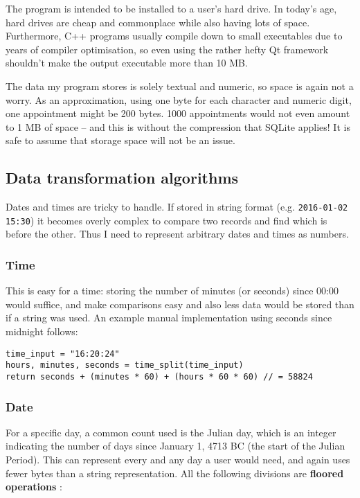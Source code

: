 The program is intended to be installed to a user's hard drive. In today's age,
hard drives are cheap and commonplace while also having lots of space.
Furthermore, C++ programs usually compile down to small executables due to years
of compiler optimisation, so even using the rather hefty Qt framework shouldn't
make the output executable more than 10 MB.

The data my program stores is solely textual and numeric, so space is again not
a worry. As an approximation, using one byte for each character and numeric
digit, one appointment might be 200 bytes. 1000 appointments would not even
amount to 1 MB of space -- and this is without the compression that SQLite
applies! It is safe to assume that storage space will not be an issue.


\subsection{Data transformation algorithms}

Dates and times are tricky to handle. If stored in string format (e.g.
\texttt{2016-01-02 15:30}) it becomes overly complex to compare two records and
find which is before the other. Thus I need to represent arbitrary dates and
times as numbers.


\subsubsection{Time}

This is easy for a time: storing the number of minutes (or seconds) since 00:00
would suffice, and make comparisons easy and also less data would be stored than
if a string was used. An example manual implementation using seconds
since midnight follows:

\begin{verbatim}
time_input = "16:20:24"
hours, minutes, seconds = time_split(time_input)
return seconds + (minutes * 60) + (hours * 60 * 60) // = 58824
\end{verbatim}


\subsubsection{Date}

For a specific day, a common count used is the Julian day, which is an integer
indicating the number of days since January 1, 4713 BC (the start of the Julian
Period). This can represent every and any day a user would need, and again uses
fewer bytes than a string representation. All the following divisions are
\textbf{floored operations} \cite{wiki-julian}:

